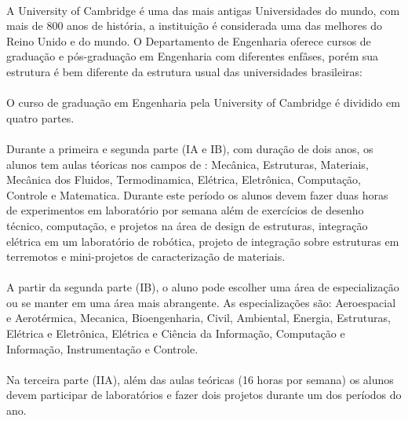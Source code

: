 \documentclass[12pt]{article} %
\begin{document}
\paragraph{} A University of Cambridge é uma das mais antigas Universidades do mundo, com mais de 800 anos de história, a instituição é considerada uma das melhores do Reino Unido e do mundo. O Departamento de Engenharia oferece cursos de graduação e pós-graduação em Engenharia com diferentes enfâses, porém sua estrutura é bem diferente da estrutura usual das universidades brasileiras:

\paragraph{} O curso de graduação em Engenharia pela University of Cambridge é dividido em quatro partes.

\paragraph{} Durante a primeira e segunda parte (IA e IB), com duração de dois anos, os alunos tem aulas téoricas nos campos de : Mecânica, Estruturas, Materiais, Mecânica dos Fluidos, Termodinamica, Elétrica, Eletrônica, Computação, Controle e Matematica. Durante este período os alunos devem fazer duas horas de experimentos em laboratório por semana além de exercícios de desenho técnico, computação, e projetos na área de design de estruturas, integração elétrica em um laboratório de robótica, projeto de integração sobre estruturas em terremotos e mini-projetos de caracterização de materiais.

\paragraph{} A partir da segunda parte (IB), o aluno pode escolher uma área de especialização ou se manter em uma área mais abrangente. As especializações são: Aeroespacial e Aerotérmica, Mecanica, Bioengenharia, Civil, Ambiental, Energia, Estruturas, Elétrica e Eletrônica, Elétrica e Ciência da Informação, Computação e Informação, Instrumentação e Controle.

\paragraph{} Na terceira parte (IIA), além das aulas teóricas (16 horas por semana) os alunos devem participar de laboratórios e fazer dois projetos durante um dos períodos do ano.
\end{document}
